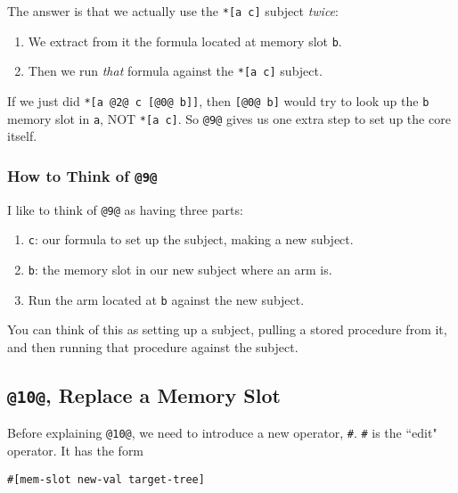 \documentclass[twoside]{article}
\begin{document}
The answer is that we actually use the \lstinline[style=inlinecode]{*[a c]} subject \emph{twice}:

\begin{enumerate}
  \item  We extract from it the formula located at memory slot \lstinline[style=inlinecode]{b}.
  \item  Then we run \emph{that} formula against the \lstinline[style=inlinecode]{*[a c]} subject.
\end{enumerate}

If we just did \lstinline[style=inlinecode]{*[a @2@ c [@0@ b]]}, then \lstinline[style=inlinecode]{[@0@ b]} would try to look up the \lstinline[style=inlinecode]{b} memory slot in \lstinline[style=inlinecode]{a}, NOT \lstinline[style=inlinecode]{*[a c]}. So \lstinline[style=inlinecode]{@9@} gives us one extra step to set up the core itself.

\subsubsection{How to Think of \lstinline[style=inlinecode]{@9@}}

I like to think of \lstinline[style=inlinecode]{@9@} as having three parts:

\begin{enumerate}
  \item  \lstinline[style=inlinecode]{c}: our formula to set up the subject, making a new subject.
  \item  \lstinline[style=inlinecode]{b}: the memory slot in our new subject where an arm is.
  \item  Run the arm located at \lstinline[style=inlinecode]{b} against the new subject.
\end{enumerate}

\noindent
You can think of this as setting up a subject, pulling a stored procedure from it, and then running that procedure against the subject.

\subsection{\lstinline[style=inlinecode]{@10@}, Replace a Memory Slot}

Before explaining \lstinline[style=inlinecode]{@10@}, we need to introduce a new operator, \lstinline[style=inlinecode]{#}. \lstinline[style=inlinecode]{#} is the ``edit" operator. It has the form

\begin{lstlisting}[style=listingcode]
#[mem-slot new-val target-tree]
\end{lstlisting}
\end{document}
